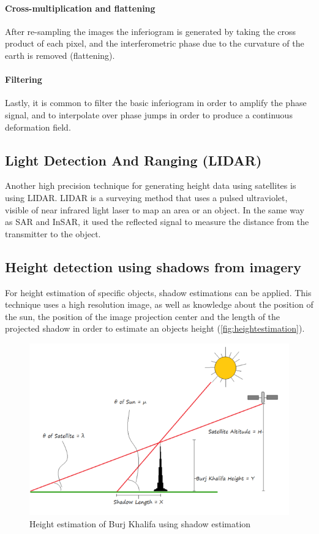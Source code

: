 \paragraph{Cross-multiplication and flattening}
After re-sampling the images the inferiogram is generated by taking the cross product of each pixel, and the interferometric phase due to the curvature of the earth is removed (flattening).

\paragraph{Filtering}
Lastly, it is common to filter the basic inferiogram in order to amplify the phase signal, and to interpolate over phase jumps in order to produce a continuous deformation field.

\subsection{Light Detection And Ranging (LIDAR)}
Another high precision technique for generating height data using satellites is using LIDAR. LIDAR is a surveying method that uses a pulsed ultraviolet, visible of near infrared light laser to map an area or an object. In the same way as SAR and InSAR, it used the reflected signal to measure the distance from the transmitter to the object.

\subsection{Height detection using shadows from imagery}
For height estimation of specific objects, shadow estimations can be applied. This technique uses a high resolution image, as well as knowledge about the position of the sun, the position of the image projection center and the length of the projected shadow in order to estimate an objects height (\autoref{fig:heightestimation}).

\begin{figure}[!h]
	\centering
	\includegraphics[scale=0.5]{fig/height_estimation.png}
	\caption{Height estimation of Burj Khalifa using shadow estimation \citep{GISLounge2014}}
	\label{fig:heightestimation}
\end{figure}

